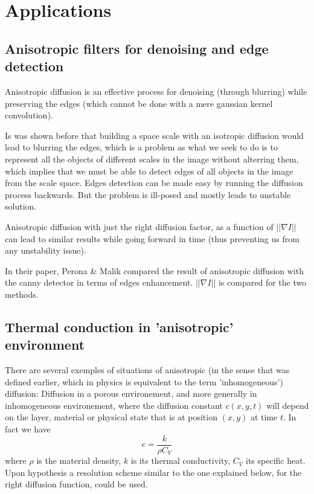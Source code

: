 \documentclass[12pt,a4paper]{article}
\begin{document}
\section{Applications}

\subsection{Anisotropic filters for denoising and edge detection}

Anisotropic diffusion is an effective process for denoising (through blurring) while preserving the edges (which cannot be done with a mere gaussian kernel convolution). 

Is was shown before that building a space scale with an isotropic diffusion would lead to blurring the edges, which is a problem as what we seek to do is to represent all the objects of different scales in the image without alterring them, which implies that we must be able to detect edges of all objects in the image from the scale space.
Edges detection can be made easy by running the diffusion process backwards. But the problem is ill-posed and mostly leads to unstable solution.

Anisotropic diffusion with just the right diffusion factor, as a function of $|| \nabla I||$ can lead to similar results while going forward in time (thus preventing us from any unstability issue).

In their paper, Perona \& Malik compared the result of anisotropic diffusion with the canny detector in terms of edges enhancement. $|| \nabla I ||$ is compared for the two methods.

\subsection{Thermal conduction in 'anisotropic' environment}

There are several exemples of situations of anisotropic (in the sense that was defined earlier, which in physics is equivalent to the term 'inhomogeneous') diffusion:
Diffusion in a porous environement, and more generally in inhomogeneous environement, where the diffusion constant $c(x,y,t)$ will depend on the layer, material or physical state that is at position $(x,y)$ at time $t$. In fact we have
	\begin{equation}
	c = \frac{k}{\rho C_{V}}
	\end{equation}
	where $\rho$ is the material density, $k$ is its thermal conductivity, $C_{V}$ its specific heat.
	Upon hypothesis a resolution scheme similar to the one explained below, for the right diffusion function, could be used.
\end{document}
